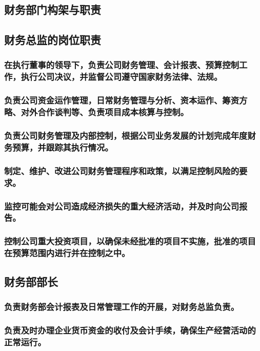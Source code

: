 \documentclass{ctexart}
\begin{document}
\subsection{财务部门构架与职责}
\label{sec-1-5}

\subsection{财务总监的岗位职责}
\label{sec-1-6}
\subsubsection{在执行董事的领导下，负责公司财务管理、会计报表、预算控制工作，执行公司决议，并监督公司遵守国家财务法律、法规。}
\label{sec-1-6-1}
\subsubsection{负责公司资金运作管理，日常财务管理与分析、资本运作、筹资方略、对外合作谈判等、负责项目成本核算与控制。}
\label{sec-1-6-2}
\subsubsection{负责公司财务管理及内部控制，根据公司业务发展的计划完成年度财务预算，并跟踪其执行情况。}
\label{sec-1-6-3}
\subsubsection{制定、维护、改进公司财务管理程序和政策，以满足控制风险的要求。}
\label{sec-1-6-4}
\subsubsection{监控可能会对公司造成经济损失的重大经济活动，并及时向公司报告。}
\label{sec-1-6-5}
\subsubsection{控制公司重大投资项目，以确保未经批准的项目不实施，批准的项目在预算范围内进行并在控制之中。}
\label{sec-1-6-6}
\subsection{财务部部长}
\label{sec-1-7}
\subsubsection{负责财务部会计报表及日常管理工作的开展，对财务总监负责。}
\label{sec-1-7-1}
\subsubsection{负责及时办理企业货币资金的收付及会计手续，确保生产经营活动的正常运行。}
\label{sec-1-7-2}
\end{document}
